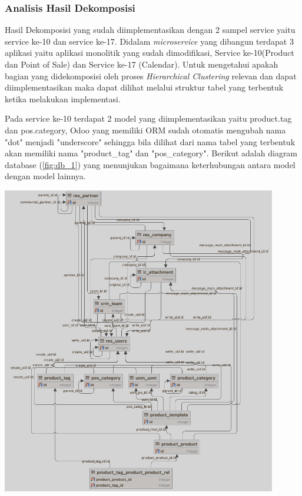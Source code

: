 

\subsubsection{Analisis Hasil Dekomposisi}
Hasil Dekomposisi yang sudah diimplementasikan dengan 2 sampel service yaitu service ke-10 dan service ke-17. Didalam \textit{microservice} yang dibangun terdapat 3 aplikasi yaitu aplikasi monolitik yang sudah dimodifikasi, Service ke-10(Product dan Point of Sale) dan Service ke-17 (Calendar). Untuk mengetahui apakah bagian yang didekomposisi oleh proses \textit{Hierarchical Clustering} relevan dan dapat diimplementasikan maka dapat dilihat melalui struktur tabel yang terbentuk ketika melakukan implementasi.

Pada service ke-10 terdapat 2 model yang diimplementasikan yaitu product.tag dan pos.category, Odoo yang memiliki ORM sudah otomatis mengubah nama "dot" menjadi "underscore" sehingga bila dilihat dari nama tabel yang terbentuk akan memiliki nama "product\_tag" dan "pos\_category". Berikut adalah diagram database (\ref{fig:db_1})  yang menunjukan bagaimana keterhubungan antara model dengan model lainnya. 

\begin{center}
	\includegraphics[width=12cm]{img/bab_4/db_1.png}
	\label{fig:db_1}
\end{center}

